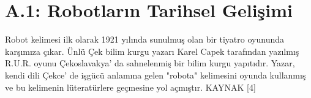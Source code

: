 \clearpage
\section{A.1: Robotların Tarihsel Gelişimi}
\label{CH:AltBolum1.1}

	Robot kelimesi ilk olarak 1921 yılında sunulmuş olan bir tiyatro oyununda karşımıza çıkar. Ünlü Çek bilim kurgu yazarı Karel Capek tarafından yazılmış R.U.R. oyunu Çekoslavakya’ da sahnelenmiş bir bilim kurgu yapıtıdır. Yazar, kendi dili Çekce’ de işgücü anlamına gelen "robota" kelimesini oyunda kullanmış ve bu kelimenin lüteratürlere geçmesine yol açmıştır. KAYNAK [4]
